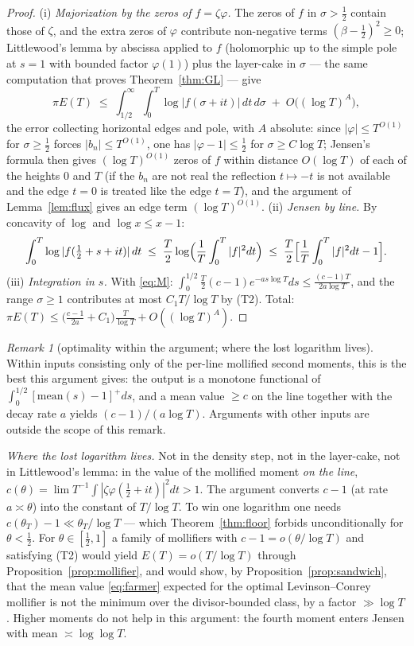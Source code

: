 \documentclass[11pt]{amsart}
\theoremstyle{plain}
\theoremstyle{definition}
\theoremstyle{remark}
\newtheorem{remark}[theorem]{Remark}
\begin{document}
\begin{proof}
(i) \emph{Majorization by the zeros of $f=\zeta\varphi$.} The zeros of $f$ in $\sigma>\tfrac12$ contain those of $\zeta$, and the extra zeros of $\varphi$ contribute non-negative terms $(\beta-\tfrac12)^2\ge0$; Littlewood's lemma by abscissa applied to $f$ (holomorphic up to the simple pole at $s=1$ with bounded factor $\varphi(1)$) plus the layer-cake in $\sigma$ --- the same computation that proves Theorem~\ref{thm:GL} --- give
\[
\pi E(T)\;\le\;\int_{1/2}^\infty\!\!\int_0^T\log|f(\sigma+it)|\,dt\,d\sigma\;+\;O\bigl((\log T)^{A}\bigr),
\]
the error collecting horizontal edges and pole, with $A$ absolute: since $|\varphi|\le T^{O(1)}$ for $\sigma\ge\tfrac12$ forces $|b_n|\le T^{O(1)}$, one has $|\varphi-1|\le\tfrac12$ for $\sigma\ge C\log T$; Jensen's formula then gives $(\log T)^{O(1)}$ zeros of $f$ within distance $O(\log T)$ of each of the heights $0$ and $T$ (if the $b_n$ are not real the reflection $t\mapsto-t$ is not available and the edge $t=0$ is treated like the edge $t=T$), and the argument of Lemma~\ref{lem:flux} gives an edge term $(\log T)^{O(1)}$.
(ii) \emph{Jensen by line.} By concavity of $\log$ and $\log x\le x-1$:
\[
\int_0^T\log|f(\tfrac12+s+it)|\,dt\;\le\;\frac T2\log\Bigl(\frac1T\int_0^T|f|^2dt\Bigr)\;\le\;\frac T2\Bigl[\frac1T\int_0^T|f|^2dt-1\Bigr].
\]
(iii) \emph{Integration in $s$.} With \eqref{eq:M}: $\int_0^{1/2}\frac T2(c-1)e^{-as\log T}ds\le\frac{(c-1)T}{2a\log T}$, and the range $\sigma\ge1$ contributes at most $C_1T/\log T$ by (T2). Total: $\pi E(T)\le\bigl(\frac{c-1}{2a}+C_1\bigr)\frac{T}{\log T}+O((\log T)^{A})$.
\end{proof}

\begin{remark}[optimality within the argument; where the lost logarithm lives]
Within inputs consisting only of the per-line mollified second moments, this is the best this argument gives: the output is a monotone functional of $\int_0^{1/2}[\mathrm{mean}(s)-1]^+ds$, and a mean value $\ge c$ on the line together with the decay rate $a$ yields $(c-1)/(a\log T)$. Arguments with other inputs are outside the scope of this remark.

\emph{Where the lost logarithm lives.} Not in the density step, not in the layer-cake, not in Littlewood's lemma: in the value of the mollified moment \emph{on the line}, $c(\theta)=\lim T^{-1}\int|\zeta\varphi(\tfrac12+it)|^2dt>1$. The argument converts $c-1$ (at rate $a\asymp\theta$) into the constant of $T/\log T$. To win one logarithm one needs $c(\theta_T)-1\ll\theta_T/\log T$ --- which Theorem~\ref{thm:floor} forbids unconditionally for $\theta<\tfrac12$. For $\theta\in[\tfrac12,1]$ a family of mollifiers with $c-1=o(\theta/\log T)$ and satisfying (T2) would yield $E(T)=o(T/\log T)$ through Proposition~\ref{prop:mollifier}, and would show, by Proposition~\ref{prop:sandwich}, that the mean value \eqref{eq:farmer} expected for the optimal Levinson--Conrey mollifier \cite{Farmer1993,BettinGonek2017} is not the minimum over the divisor-bounded class, by a factor $\gg\log T$. Higher moments do not help in this argument: the fourth moment enters Jensen with mean $\asymp\log\log T$.
\end{remark}
\end{document}
